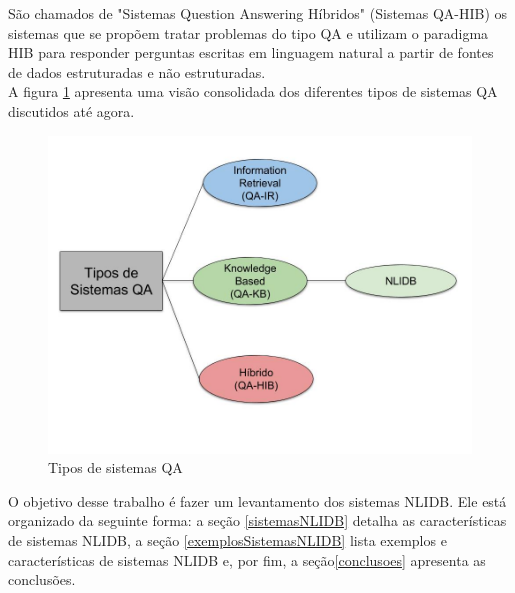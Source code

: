 \documentclass{article}
\begin{document}
São chamados de "Sistemas Question Answering Híbridos" (Sistemas QA-HIB) os sistemas que se propõem tratar problemas do tipo QA e utilizam o paradigma HIB para responder perguntas escritas em linguagem natural a partir de fontes de dados estruturadas e não estruturadas.\\

A figura \ref{fig:TiposDeSistemasQA} apresenta uma visão consolidada dos diferentes tipos de sistemas QA discutidos até agora.\\

\begin{figure}[h!]
\centering
\includegraphics[scale=0.3]{TiposDeSistemasQA.jpg}
\caption{Tipos de sistemas QA}
\label{fig:TiposDeSistemasQA}
\end{figure}

O objetivo desse trabalho é fazer um levantamento dos sistemas NLIDB. Ele está organizado da seguinte forma: a seção \ref{sistemasNLIDB} detalha as características de sistemas NLIDB, a seção \ref{exemplosSistemasNLIDB} lista exemplos e características de sistemas NLIDB e, por fim, a seção\ref{conclusoes} apresenta as conclusões.

\end{document}
